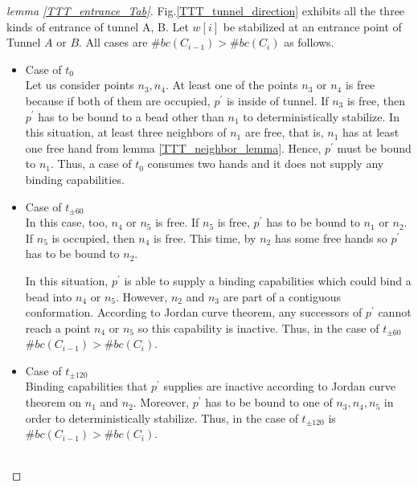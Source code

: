 \documentclass[runningheads]{llncs}
\begin{document}
\begin{proof}[lemma \ref{TTT_entrance_Tab}]
Fig.\ref{TTT_tunnel_direction} exhibits all the three kinds of entrance of tunnel A, B.
Let $w[i]$ be stabilized at an entrance point of Tunnel $A$ or $B$.
All cases are $\#bc(C_{i-1}) > \#bc(C_{i})$ as follows.


\begin{itemize}
\item{Case of $t_0$}\\
  Let us consider points $n_3,n_4$. At least one of the points $n_3$ or $n_4$ is free because if both of them are occupied, $p^\prime$ is inside of tunnel. If $n_3$ is free, then $p^\prime$ has to be bound to a bead other than $n_1$ to deterministically stabilize. In this situation, at least three neighbors of $n_1$ are free, that is, $n_1$ has at least one free hand from lemma \ref{TTT_neighbor_lemma}. Hence, $p^\prime$ must be bound to $n_1$. Thus, a case of $t_0$ consumes two hands and it does not supply any binding capabilities.

\item{Case of $t_{\pm 60}$}\\
  In this case, too, $n_4$ or $n_5$ is free. If $n_5$ is free, $p^\prime$ has to be bound to $n_1$ or $n_2$. If $n_5$ is occupied, then $n_4$ is free. This time, by $n_2$ has some free hands so $p^\prime$ has to be bound to $n_2$.
  

  In this situation, $p^\prime$ is able to supply a binding capabilities which could bind a bead into $n_4$ or $n_5$. However, $n_2$ and $n_3$ are part of a contiguous conformation. According to Jordan curve theorem, any successors of $p^\prime$ cannot reach a point $n_4$ or $n_5$ so this capability is inactive. Thus, in the case of $t_{\pm 60}$ $\#bc(C_{i-1}) > \#bc(C_{i})$.

\item{Case of $t_{\pm 120}$}\\
  Binding capabilities that $p^\prime$ supplies are inactive according to Jordan curve theorem on $n_1$ and $n_2$. Moreover, $p^\prime$ has to be bound to one of $n_3, n_4, n_5$ in order to deterministically stabilize.
Thus, in the case of $t_{\pm 120}$ is $\#bc(C_{i-1}) > \#bc(C_{i})$.
  
\end{itemize}

\begin{figure}
  \begin{center}
    \begin{tabular}{ccc}
    

\end{tabular}
\end{center}
\end{figure}
\end{proof}
\end{document}
